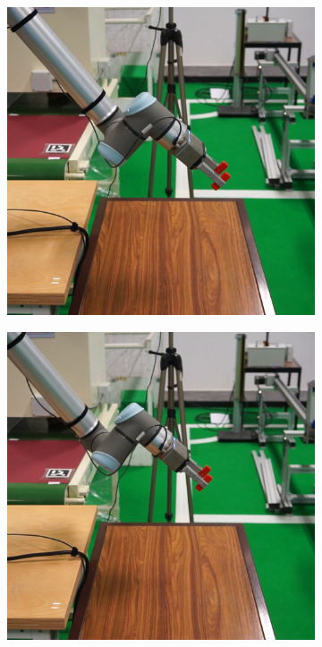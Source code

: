 \begin{figure}[h]
\begin{subfigure}{.2\linewidth}
    \end{subfigure}%
    \begin{subfigure}{.2\linewidth}
        \centering
        \includegraphics[width=.95\linewidth]{figs/chp6/col_real_no_3.jpg}
    \end{subfigure}%
    \begin{subfigure}{.2\linewidth}
        \centering
        \includegraphics[width=.95\linewidth]{figs/chp6/col_real_no_4.jpg}

\end{subfigure}
\end{figure}
